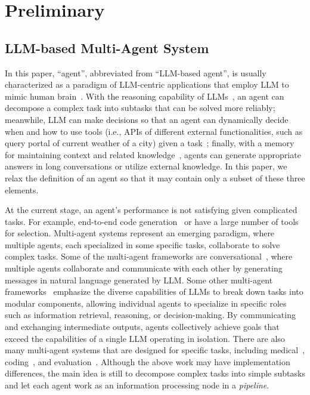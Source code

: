 \section{Preliminary}

\subsection{LLM-based Multi-Agent System}
In this paper, ``agent'', abbreviated from ``LLM-based agent'', is usually characterized as a paradigm of LLM-centric applications that employ LLM to mimic human brain~\cite{agent_intro}.
With the reasoning capability of LLMs~\cite{wei2022chain, yao2024tree, liu2023llm+, lu2024chameleon}, an agent can decompose a complex task into subtasks that can be solved more reliably;
meanwhile, LLM can make decisions so that an agent can dynamically decide when and how to use tools (i.e., APIs of different external functionalities, such as query portal of current weather of a city) given a task~\cite{yao2022react, parisi2022talm, schick2023toolformer}; finally, with a memory for maintaining context and related knowledge~\cite{shinn2024reflexion, hatalis2023memory}, agents can generate appropriate answers in long conversations or utilize external knowledge.
In this paper, we relax the definition of an agent so that it may contain only a subset of these three elements.

At the current stage, an agent's performance is not satisfying given complicated tasks.
For example, end-to-end code generation~\cite{hongmetagpt} or have a large number of tools for selection.
Multi-agent systems represent an emerging paradigm, where multiple agents, each specialized in some specific tasks, collaborate to solve complex tasks. 
Some of the multi-agent frameworks are conversational~\cite{wu2023autogen, li2023camel}, where multiple agents collaborate and communicate with each other by generating messages in natural language generated by LLM.
Some other multi-agent frameworks~\cite{hongmetagpt} emphasize the diverse capabilities of LLMs to break down tasks into modular components, allowing individual agents to specialize in specific roles such as information retrieval, reasoning, or decision-making. 
By communicating and exchanging intermediate outputs, agents collectively achieve goals that exceed the capabilities of a single LLM operating in isolation. 
There are also many multi-agent systems that are designed for specific tasks, including medical~\cite{tang2023medagents}, coding~\cite{yang2024swe}, and evaluation~\cite{chan2023chateval}.
Although the above work may have implementation differences, the main idea is still to decompose complex tasks into simple subtasks and let each agent work as an information processing node in a \emph{pipeline}.




